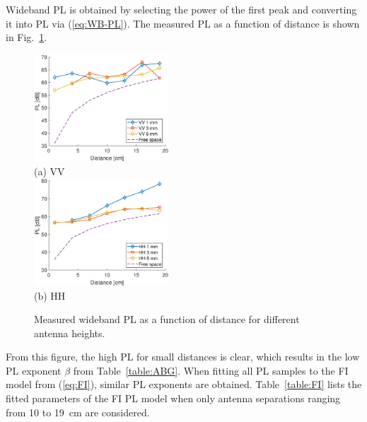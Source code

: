 \documentclass[preprint]{rsl}
\begin{document}
Wideband PL is obtained by selecting the power of the first peak and converting it into PL via (\ref{eq:WB-PL}). 
The measured PL as a function of distance is shown in Fig.~\ref{fig:PL_vs_dist}. 
\begin{figure}[tb]
\begin{center}
	\includegraphics[width=0.45\textwidth]{figures/PL_vs_dist_VV}
	\\
	(a) VV
	\\
	\includegraphics[width=0.45\textwidth]{figures/PL_vs_dist_HH}
	\\
	(b) HH
\caption{Measured wideband PL as a function of distance for different antenna heights.}
\label{fig:PL_vs_dist}
\end{center}
\end{figure}
From this figure, the high PL for small distances is clear, which results in the low PL exponent $\beta$ from Table~\ref{table:ABG}.
When fitting all PL samples to the FI model from (\ref{eq:FI}), similar PL exponents are obtained. 
Table~\ref{table:FI} lists the fitted parameters of the FI PL model when only antenna separations ranging from 10 to 19~cm are considered.
\end{document}
